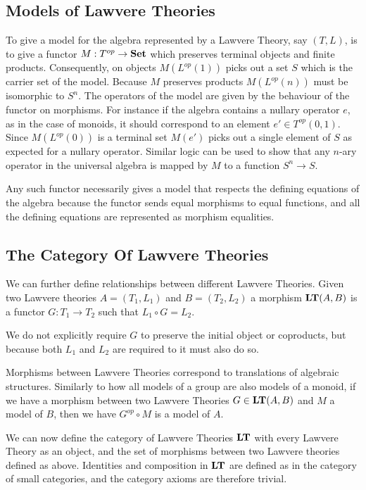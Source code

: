 \subsection{Models of Lawvere Theories}
To give a model for the algebra represented by a Lawvere Theory, say $(T, L)$,
is to give a functor $M: T^{op}\to \mathbf{Set}$ which preserves terminal
objects and finite products. Consequently, on objects $M(L^{op}(1))$ picks out a
set $S$ which is the carrier set of the model. Because $M$ preserves products
$M(L^{op}(n))$ must be isomorphic to $S^n$. The operators of the model are given
by the behaviour of the functor on morphisms. For instance if the algebra
contains a nullary operator $e$, as in the case of monoids, it should correspond
to an element $e'\in T^{op}(0,1)$. Since $M(L^{op}(0))$ is a terminal set
$M(e')$ picks out a single element of $S$ as expected for a nullary operator.
Similar logic can be used to show that any $n$-ary operator in the universal
algebra is mapped by $M$ to a function $S^n\to S$.

Any such functor necessarily gives a model that respects the defining equations
of the algebra because the functor sends equal morphisms to equal
functions, and all the defining equations are represented as morphism
equalities.

\subsection{The Category Of Lawvere Theories}
We can further define relationships between different Lawvere Theories. Given
two Lawvere theories $A = (T_1, L_1)$ and $B = (T_2, L_2)$ a morphism
$\mathbf{LT}(A, B)$ is a functor $G: T_1\to T_2$ such that $L_1\circ G = L_2$.

We do not explicitly require $G$ to preserve the initial object or coproducts,
but because both $L_1$ and $L_2$ are required to it must also do so.

Morphisms between Lawvere Theories correspond to translations of algebraic
structures. Similarly to how all models of a group are also models of a monoid,
if we have a morphism between two Lawvere Theories $G\in \mathbf{LT}(A, B)$ and
$M$ a model of $B$, then we have $G^{op}\circ M$ is a model of $A$.

We can now define the category of Lawvere Theories $\mathbf{LT}$ with every
Lawvere Theory as an object, and the set of morphisms between two Lawvere
theories defined as above. Identities and composition in $\mathbf{LT}$ are
defined as in the category of small categories, and the category axioms are
therefore trivial.

